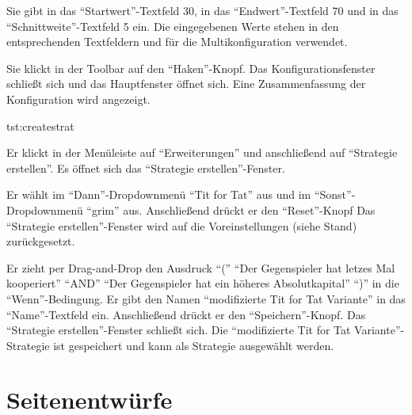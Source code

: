 \documentclass[parskip=full,11pt]{scrartcl}
\begin{document}
{Sie gibt in das \enquote{Startwert}-Textfeld 30, in das \enquote{Endwert}-Textfeld 70 und in das \enquote{Schnittweite}-Textfeld 5 ein.}
{Die eingegebenen Werte stehen in den entsprechenden Textfeldern und für die Multikonfiguration verwendet.}

{Sie klickt in der Toolbar auf den \enquote{Haken}-Knopf.}
{Das Konfigurationsfenster schließt sich und das Hauptfenster öffnet sich. Eine Zusammenfassung der Konfiguration wird angezeigt.}

{tst:createstrat}

{Er klickt in der Menüleiste auf \enquote{Erweiterungen} und anschließend auf \enquote{Strategie erstellen}.}
{Es öffnet sich das \enquote{Strategie erstellen}-Fenster.}

{Er wählt im \enquote{Dann}-Dropdownmenü \enquote{Tit for Tat} aus und im \enquote{Sonst}-Dropdownmenü \enquote{grim} aus. Anschließend drückt er den \enquote{Reset}-Knopf}
{Das \enquote{Strategie erstellen}-Fenster wird auf die Voreinstellungen (siehe Stand) zurückgesetzt.}

{Er zieht per Drag-and-Drop den Ausdruck \enquote{(} \enquote{Der Gegenspieler hat letzes Mal kooperiert} \enquote{AND} \enquote{Der Gegenspieler hat ein höheres Absolutkapital} \enquote{)} in die \enquote{Wenn}-Bedingung. Er gibt den Namen \enquote{modifizierte Tit for Tat Variante} in das \enquote{Name}-Textfeld ein. Anschließend drückt er den \enquote{Speichern}-Knopf.}
{Das \enquote{Strategie erstellen}-Fenster schließt sich. Die \enquote{modifizierte Tit for Tat Variante}-Strategie ist gespeichert und kann als Strategie ausgewählt werden.}


\appendix
\newpage
\section{Seitenentwürfe}
\end{document}

